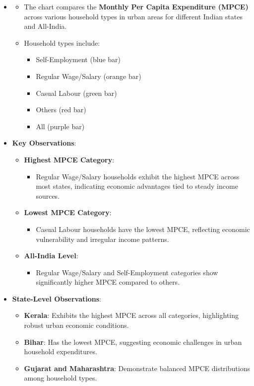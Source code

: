 \documentclass{article}
\begin{document}
\begin{itemize}
	\item 
	\begin{itemize}
		\item The chart compares the \textbf{Monthly Per Capita Expenditure (MPCE)} across various household types in urban areas for different Indian states and All-India.
		\item Household types include:
		\begin{itemize}
			\item Self-Employment (blue bar)
			\item Regular Wage/Salary (orange bar)
			\item Casual Labour (green bar)
			\item Others (red bar)
			\item All (purple bar)
		\end{itemize}
	\end{itemize}
	\item \textbf{Key Observations}:
	\begin{itemize}
		\item \textbf{Highest MPCE Category}:
		\begin{itemize}
			\item Regular Wage/Salary households exhibit the highest MPCE across most states, indicating economic advantages tied to steady income sources.
		\end{itemize}
		\item \textbf{Lowest MPCE Category}:
		\begin{itemize}
			\item Casual Labour households have the lowest MPCE, reflecting economic vulnerability and irregular income patterns.
		\end{itemize}
		\item \textbf{All-India Level}:
		\begin{itemize}
			\item Regular Wage/Salary and Self-Employment categories show significantly higher MPCE compared to others.
		\end{itemize}
	\end{itemize}
	\item \textbf{State-Level Observations}:
	\begin{itemize}
		\item \textbf{Kerala}: Exhibits the highest MPCE across all categories, highlighting robust urban economic conditions.
		\item \textbf{Bihar}: Has the lowest MPCE, suggesting economic challenges in urban household expenditures.
		\item \textbf{Gujarat and Maharashtra}: Demonstrate balanced MPCE distributions among household types.
	\end{itemize}
\end{itemize}
\end{document}
